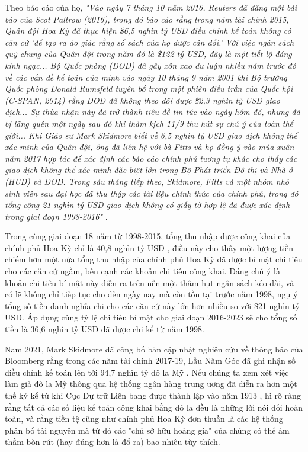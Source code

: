 Theo báo cáo của họ, \textit{"Vào ngày 7 tháng 10 năm 2016, Reuters đã đăng một bài báo của Scot Paltrow (2016), trong đó báo cáo rằng trong năm tài chính 2015, Quân đội Hoa Kỳ đã thực hiện \$6,5 nghìn tỷ USD điều chỉnh kế toán không có căn cứ 'để tạo ra ảo giác rằng sổ sách của họ được cân đối.' Với việc ngân sách quỹ chung của Quân đội trong năm đó là \$122 tỷ USD, đây là một tiết lộ đáng kinh ngạc... Bộ Quốc phòng (DOD) đã gây xôn xao dư luận nhiều năm trước đó về các vấn đề kế toán của mình vào ngày 10 tháng 9 năm 2001 khi Bộ trưởng Quốc phòng Donald Rumsfeld tuyên bố trong một phiên điều trần của Quốc hội (C-SPAN, 2014) rằng DOD đã không theo dõi được \$2,3 nghìn tỷ USD giao dịch... Sự thừa nhận này đã trở thành tiêu đề tin tức vào ngày hôm đó, nhưng đã bị lãng quên một ngày sau đó khi thảm kịch 11/9 thu hút sự chú ý của toàn thế giới... Khi Giáo sư Mark Skidmore biết về 6,5 nghìn tỷ USD giao dịch không thể xác minh của Quân đội, ông đã liên hệ với bà Fitts và họ đồng ý vào mùa xuân năm 2017 hợp tác để xác định các báo cáo chính phủ tương tự khác cho thấy các giao dịch không thể xác minh đặc biệt lớn trong Bộ Phát triển Đô thị và Nhà ở (HUD) và DOD. Trong sáu tháng tiếp theo, Skidmore, Fitts và một nhóm nhỏ sinh viên sau đại học đã thu thập các tài liệu chính thức của chính phủ, trong đó tổng cộng 21 nghìn tỷ USD giao dịch không có giấy tờ hợp lệ đã được xác định trong giai đoạn 1998-2016"} \cite{12}.

Trong cùng giai đoạn 18 năm từ 1998-2015, tổng thu nhập được công khai của chính phủ Hoa Kỳ chỉ là 40,8 nghìn tỷ USD \cite{15}, điều này cho thấy một lượng tiền chiếm hơn một nửa tổng thu nhập của chính phủ Hoa Kỳ đã được bí mật chi tiêu cho các căn cứ ngầm, bên cạnh các khoản chi tiêu công khai. Đáng chú ý là khoản chi tiêu bí mật này diễn ra trên nền một thâm hụt ngân sách kéo dài, và có lẽ không chỉ tiếp tục cho đến ngày nay mà còn tồn tại trước năm 1998, ngụ ý tổng số tiền danh nghĩa chi cho các căn cứ này lớn hơn nhiều so với \$21 nghìn tỷ USD. Áp dụng cùng tỷ lệ chi tiêu bí mật cho giai đoạn 2016-2023 sẽ cho tổng số tiền là 36,6 nghìn tỷ USD đã được chi kể từ năm 1998.

Năm 2021, Mark Skidmore đã công bố bản cập nhật nghiên cứu về thông báo của Bloomberg rằng trong các năm tài chính 2017-19, Lầu Năm Góc đã ghi nhận số điều chỉnh kế toán lên tới 94,7 nghìn tỷ đô la Mỹ \cite{17,18}. Nếu chúng ta xem xét việc làm giả đô la Mỹ thông qua hệ thống ngân hàng trung ương đã diễn ra hơn một thế kỷ kể từ khi Cục Dự trữ Liên bang được thành lập vào năm 1913 \cite{37}, hì rõ ràng rằng tất cả các số liệu kế toán công khai bằng đô la đều là những lời nói dối hoàn toàn, và rằng tiền tệ cũng như chính phủ Hoa Kỳ đơn thuần là các hệ thống phân bổ tài nguyên mà từ đó các "chủ sở hữu hoàng gia" của chúng có thể âm thầm bòn rút (hay đúng hơn là đổ ra) bao nhiêu tùy thích.

